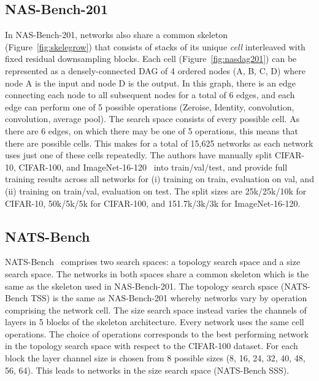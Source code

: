 \documentclass{article}
\begin{document}
\subsection{NAS-Bench-201}
\label{sec:nasbench201}


In NAS-Bench-201, networks also share a common skeleton (Figure~\ref{fig:skelegrow}) that consists of stacks of its unique {\it cell} interleaved with fixed residual downsampling blocks. Each cell (Figure~\ref{fig:nasdag201}) can be represented as a densely-connected DAG of 4 ordered nodes (A, B, C, D) where node A is the input and node D is the output. In this graph, there is an edge connecting each node to all subsequent nodes for a total of 6 edges, and each edge can perform one of 5 possible operations (Zeroise, Identity,  convolution,  convolution,  average pool). The search space consists of every possible cell. As there are 6 edges, on which there may be one of 5 operations, this means that there are  possible cells. This makes for a total of 15,625 networks as each network uses just one of these cells repeatedly. The authors have manually split CIFAR-10, CIFAR-100, and ImageNet-16-120~\citep{chrabaszcz2017downsampled} into train/val/test, and provide full training results across all networks for (i) training on train, evaluation on val, and (ii) training on train/val, evaluation on test. The split sizes are 25k/25k/10k for CIFAR-10, 50k/5k/5k for CIFAR-100, and 151.7k/3k/3k for ImageNet-16-120.

\subsection{NATS-Bench}
\label{sec:natsbench}
NATS-Bench~\citep{dong2021nats} comprises two search spaces: a topology search space and a size search space. The networks in both spaces share a common skeleton which is the same as the skeleton used in NAS-Bench-201. The topology search space (NATS-Bench TSS) is the same as NAS-Bench-201 whereby networks vary by operation comprising the network cell. 
The size search space instead varies the channels of layers in 5 blocks of the skeleton architecture. Every network uses the same cell operations. The choice of operations corresponds to the best performing network in the topology search space with respect to the CIFAR-100 dataset. For each block the layer channel size is chosen from 8 possible sizes (8, 16, 24, 32, 40, 48, 56, 64). This leads to  networks in the size search space (NATS-Bench SSS).
\end{document}
